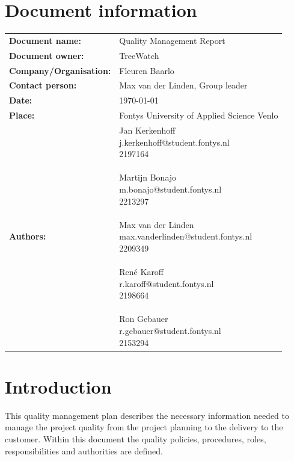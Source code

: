 \documentclass[12pt]{article}
\begin{document}
\section*{Document information}
\begin{tabular}{ll}
	\textbf{Document name:} & Quality Management Report\\
	\textbf{Document owner:} & TreeWatch \\
	\textbf{Company/Organisation:} & Fleuren Baarlo \\
	\textbf{Contact person:} & Max van der Linden, Group leader \\
	\textbf{Date:} & \today \\
	\textbf{Place:} & Fontys University of Applied Science Venlo \\
	\textbf{Authors:} & \parbox[t]{5cm}{
		Jan Kerkenhoff\\ j.kerkenhoff@student.fontys.nl\\ 2197164 \\ \\
		Martijn Bonajo\\ m.bonajo@student.fontys.nl\\ 2213297 \\ \\
		Max van der Linden\\ max.vanderlinden@student.fontys.nl\\ 2209349 \\ \\
		René Karoff\\ r.karoff@student.fontys.nl\\ 2198664 \\ \\
		Ron Gebauer\\ r.gebauer@student.fontys.nl\\ 2153294 \\ }
\end{tabular}
\clearpage
\listoffigures
{}
\listoftables
{}
\pagebreak

\tableofcontents
\clearpage

\section{Introduction}
This quality management plan describes the necessary information needed to manage the project quality from the project planning to the delivery to the customer. Within this document the quality policies, procedures, roles, responsibilities and authorities are defined.
\clearpage
\end{document}
